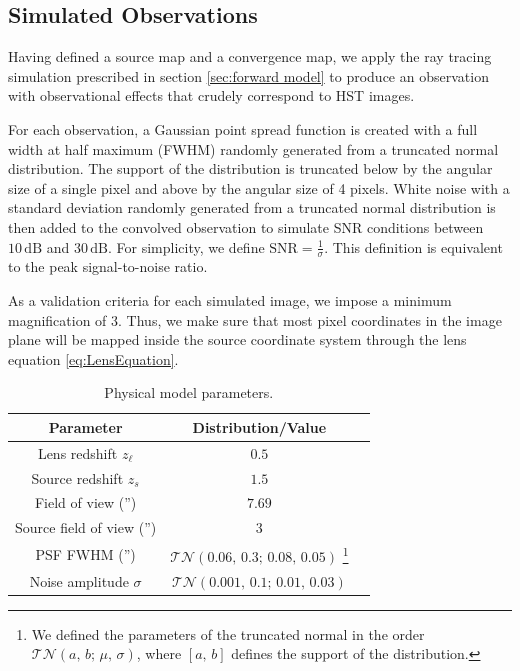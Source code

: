 \subsection{Simulated Observations}\label{sec:simulated observation}
Having defined a source map and a convergence map, we apply the ray tracing simulation 
prescribed in section \ref{sec:forward model} to produce an observation 
with observational effects that crudely correspond to HST images. 

For each observation, a Gaussian point spread function is 
created with a full width at half maximum (FWHM) 
randomly generated from a truncated normal distribution.
The support of the distribution is truncated below by the 
angular size of a single pixel and above by the angular size of 4 pixels. 
White noise with a standard deviation randomly generated from a truncated normal distribution 
is then added to the convolved observation to simulate SNR conditions between 
$10\,\mathrm{dB}$ and $30\,\mathrm{dB}$. For simplicity, we define $\mathrm{SNR} = \frac{1}{\sigma}$. 
This definition is equivalent to the peak signal-to-noise ratio. 

As a validation criteria for each simulated image, we impose 
a minimum magnification of 3. Thus, 
we make sure that most pixel coordinates in the image plane will be mapped inside the 
source coordinate system through the lens equation \eqref{eq:LensEquation}. 

\begin{table}[htb!]
\centering
\caption{Physical model parameters.}
\label{tab:phys}
\begin{tabular}{ccc}
        Parameter &  Distribution/Value \\
        \hline \hline
        Lens redshift $z_\ell$ & $0.5$ \\
        Source redshift $z_s$ & $1.5$ \\
        Field of view ('') & $7.69$ \\
        Source field of view ('') & $3$ \\
        PSF FWHM ('') & $\mathcal{TN}(0.06,\, 0.3;\, 0.08,\, 0.05)$
        \footnote{We defined the parameters of the truncated normal in the order $\mathcal{TN}(a,\, b;\, \mu,\, \sigma)$, where $[a,\, b]$ defines the support of the distribution.} \\
        Noise amplitude $\sigma$ & $\mathcal{TN}(0.001,\, 0.1;\, 0.01,\,0.03)$\\
        \hline
\end{tabular}
\end{table}

